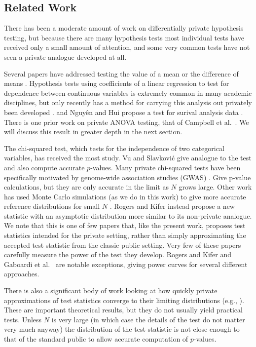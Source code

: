 \subsection{Related Work}


There has been a moderate amount of work on differentially private hypothesis testing, but because there are many hypothesis tests most individual tests have received only a small amount of attention, and some very common tests have not seen a private analogue developed at all.  


Several papers have addressed testing the value of a mean or the difference of means \cite{solea2014differentially, d2015differential, ding2018comparing}.  Hypothesis tests using coefficients of a linear regression to test for dependence between continuous variables is extremely common in many academic disciplines, but only recently has a method for carrying this analysis out privately been developed \cite{sheffet2015differentially, barrientos2017differentially}. and Nguy{\^e}n and Hui propose a test for surival analysis data \cite{nguyen2017differentially}.  There is one prior work on private ANOVA testing, that of  Campbell et al.~\cite{campbell2018diffprivanova}.  We will discuss this result in greater depth in the next section.


The chi-squared test, which tests for the independence of two categorical variables, has received the most study.  Vu and Slavkovi\'{c} \cite{vu2009differential} give analogue to the test and also compute accurate $p$-values.   Many private chi-squared tests have been specifically motivated by genome-wide association studies (GWAS)  \cite{fienberg2011privacy, uhlerop2013privacy, johnson2013privacy}.  Give p-value calculations, but they are only accurate in the limit as $N$ grows large.  Other work has used Monte Carlo simulations (as we do in this work) to give more accurate reference distributions for small $N$ \cite{gaboardi2016differentially, wang2015revisiting}.  Rogers and Kifer \cite{rogers2017new} instead propose a new statistic with an asymptotic distribution more similar to its non-private analogue.  We note that this is one of few papers that, like the present work, proposes test statistics intended for the private setting, rather than simply approximating the accepted test statistic from the classic public setting. Very few of these papers carefully measure the power of the test they develop.  Rogers and Kifer \cite{rogers2017new} and Gaboardi et al.~\cite{gaboardi2016differentially} are notable exceptions, giving power curves for several different approaches.


There is also a significant body of work looking at how quickly private approximations of test statistics converge to their limiting distributions (e.g., \cite{smith2008efficient, wasserman2010statistical, smith2011privacy}).  These are important theoretical results, but they do not usually yield practical tests.  Unless $N$ is very large (in which case the details of the test do not matter very much anyway) the distribution of the test statistic is not close enough to that of the standard public to allow accurate computation of $p$-values.